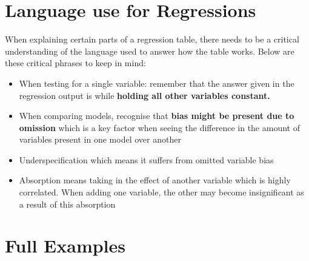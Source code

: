 \documentclass[12pt, letterpaper]{article}
\begin{document}
\section{Language use for Regressions}
When explaining certain parts of a regression table, there needs to be a critical understanding of the language used to answer how the table works. Below are these critical phrases to keep in mind:
\begin{itemize}
	\item When testing for a single variable: remember that the answer given in the regression output is while \textbf{holding all other variables constant.}
	\item When comparing models, recognise that \textbf{bias might be present due to omission} which is a key factor when seeing the difference in the amount of variables present in one model over another
	\item Underspecification which means it suffers from omitted variable bias
	\item Absorption means taking in the effect of another variable which is highly correlated. When adding one variable, the other may become insignificant as a result of this absorption
\end{itemize}

\newpage
\section{Full Examples}
\end{document}
